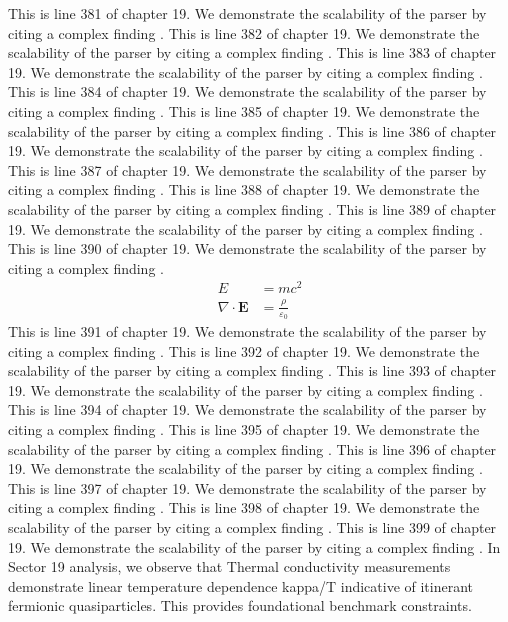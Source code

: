 This is line 381 of chapter 19. We demonstrate the scalability of the parser by citing a complex finding \cite{ref19_381}.
This is line 382 of chapter 19. We demonstrate the scalability of the parser by citing a complex finding \cite{ref19_382}.
This is line 383 of chapter 19. We demonstrate the scalability of the parser by citing a complex finding \cite{ref19_383}.
This is line 384 of chapter 19. We demonstrate the scalability of the parser by citing a complex finding \cite{ref19_384}.
This is line 385 of chapter 19. We demonstrate the scalability of the parser by citing a complex finding \cite{ref19_385}.
This is line 386 of chapter 19. We demonstrate the scalability of the parser by citing a complex finding \cite{ref19_386}.
This is line 387 of chapter 19. We demonstrate the scalability of the parser by citing a complex finding \cite{ref19_387}.
This is line 388 of chapter 19. We demonstrate the scalability of the parser by citing a complex finding \cite{ref19_388}.
This is line 389 of chapter 19. We demonstrate the scalability of the parser by citing a complex finding \cite{ref19_389}.
This is line 390 of chapter 19. We demonstrate the scalability of the parser by citing a complex finding \cite{ref19_390}.
\begin{align*}
  E &= mc^2 \\
  \nabla \cdot \mathbf{E} &= \frac{\rho}{\varepsilon_0}
\end{align*}
This is line 391 of chapter 19. We demonstrate the scalability of the parser by citing a complex finding \cite{ref19_391}.
This is line 392 of chapter 19. We demonstrate the scalability of the parser by citing a complex finding \cite{ref19_392}.
This is line 393 of chapter 19. We demonstrate the scalability of the parser by citing a complex finding \cite{ref19_393}.
This is line 394 of chapter 19. We demonstrate the scalability of the parser by citing a complex finding \cite{ref19_394}.
This is line 395 of chapter 19. We demonstrate the scalability of the parser by citing a complex finding \cite{ref19_395}.
This is line 396 of chapter 19. We demonstrate the scalability of the parser by citing a complex finding \cite{ref19_396}.
This is line 397 of chapter 19. We demonstrate the scalability of the parser by citing a complex finding \cite{ref19_397}.
This is line 398 of chapter 19. We demonstrate the scalability of the parser by citing a complex finding \cite{ref19_398}.
This is line 399 of chapter 19. We demonstrate the scalability of the parser by citing a complex finding \cite{ref19_399}.
In Sector 19 analysis, we observe that Thermal conductivity measurements demonstrate linear temperature dependence kappa/T indicative of itinerant fermionic quasiparticles. This provides foundational benchmark constraints.
